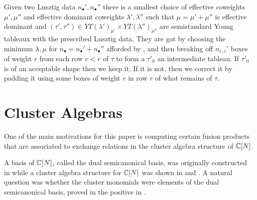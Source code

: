 \documentclass[draft]{article}
\begin{document}
\begin{proposition}
    \label{prop:minwts}
    Given two Lusztig data $n_\bullet',n_\bullet''$ there is a smallest choice of effective coweights $\mu',\mu''$ and effective dominant coweights $\lambda',\lambda''$ such that $\mu = \mu' + \mu''$ is effective dominant and $(\tau',\tau'')\in YT(\lambda')_{\mu'}\times YT(\lambda'')_{\mu''}$ are semistandard Young tableaux with the prescribed Lusztig data. They are got by choosing the minimum $\lambda,\mu$ for $n_\bullet = n_\bullet ' + n_\bullet ''$ afforded by , and then breaking off $n_{r,c}'$ boxes of weight $r$ from each row $c<r$ of $\tau$ to form a $\tau'_0$ an intermediate tableau. If $\tau'_0$ is of an acceptable shape then we keep it. If it is not, then we correct it by padding it using some boxes of weight $r$ in row $r$ of what remains of $\tau$.

\end{proposition}

% 
\section{Cluster Algebras}
One of the main motivations for this paper is computing certain fusion products that are associated to exchange relations in the cluster algebra structure of $\mathbb C[N]$. 

A basis of $\mathbb C[N]$, called the dual semicanonical basis, was originally constructed in \cite{lusztig2000semicanonical} while a cluster algebra structure for $\mathbb C[N]$ was shown in \cite{berenstein2005cluster3} and \cite{geiss2007initial}.
A natural question was whether the cluster monomials were elements of the dual semicanonical basis, proved in the positive in \cite{geiss2006rigid}.
\end{document}
